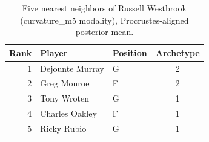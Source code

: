 \begin{table}[htbp]
  \centering\small
  \begin{tabular}{rllc}
    \toprule
    Rank & Player & Position & Archetype \\
    \midrule
    1 & Dejounte Murray & G & 2 \\
    2 & Greg Monroe & F & 2 \\
    3 & Tony Wroten & G & 1 \\
    4 & Charles Oakley & F & 1 \\
    5 & Ricky Rubio & G & 1 \\
    \bottomrule
  \end{tabular}
  \caption{Five nearest neighbors of Russell Westbrook (curvature_m5 modality), Procrustes-aligned posterior mean.}
  \label{tab:Russell_Westbrook_neighbors_curvature_m5}
\end{table}

